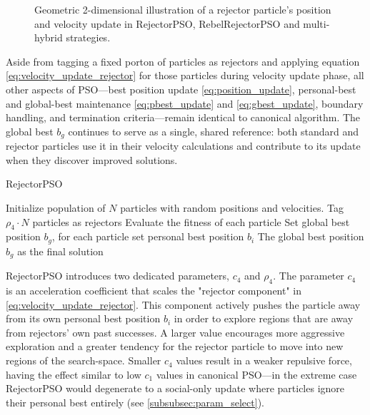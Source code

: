 {\begin{figure}[H]
\begin{tikzpicture}
    \end{tikzpicture}
    \caption[Geometric illustration of rejector particle's position and velocity update]{Geometric 2-dimensional illustration of a rejector particle's position and velocity update in RejectorPSO, RebelRejectorPSO and multi-hybrid strategies.}
    \label{fig:RejectorPSO_geometric_illustration}
\end{figure}

Aside from tagging 
a fixed porton of particles as rejectors and applying equation \eqref{eq:velocity_update_rejector} for those particles during velocity update phase, all other aspects of PSO---best position update \eqref{eq:position_update}, personal-best and global-best maintenance \eqref{eq:pbest_update} and \eqref{eq:gbest_update}, boundary handling, and termination criteria---remain identical to canonical algorithm. The global best 
$b_g$ continues to serve as a single, shared reference: both standard and rejector particles use it in their velocity calculations and contribute to its update when they discover improved solutions. 

\vspace{.935em}
\begin{algorithm}[H]
\caption{RejectorPSO}\label{alg:rejector}
Initialize population of \(N\) particles with random positions and velocities. Tag \(\rho_4 \cdot N\) particles as rejectors\;
Evaluate the fitness of each particle\;
Set global best position \(b_g\), for each particle set personal best position \(b_i\)\;
\Return The global best position \(b_g\) as the final solution\;
\end{algorithm}
\vspace{.935em}

RejectorPSO introduces two dedicated parameters, $c_4$ and $\rho_4$. The parameter $c_4$ is an acceleration coefficient that scales the "rejector component" in \eqref{eq:velocity_update_rejector}. This component actively pushes the particle away from its own personal best position $b_i$ in order to explore regions that are away from rejectors' own past successes.
A larger value encourages more aggressive exploration and a greater tendency for the rejector particle to move into new regions of the \gls{search-space}. Smaller $c_4$ values result in a weaker repulsive force, having the effect similar to low $c_1$ values in canonical PSO---in the extreme case RejectorPSO would degenerate to a social\-\mbox{-only} update where particles ignore their personal best entirely (see \autoref{subsubsec:param_select}).

}
